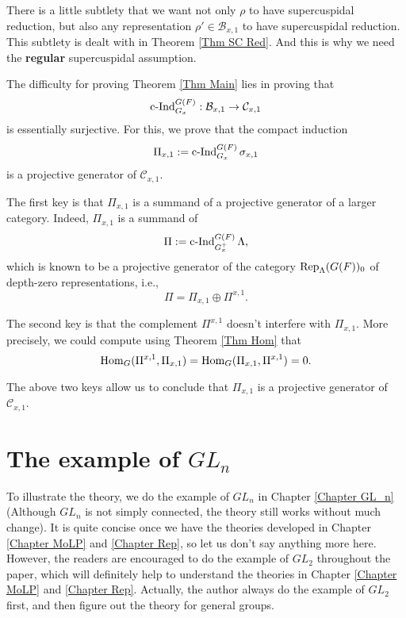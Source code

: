 There is a little subtlety that we want not only $\rho$ to have supercuspidal reduction, but also any representation $\rho' \in \mathcal{B}_{x,1}$ to have supercuspidal reduction. This subtlety is dealt with in Theorem \ref{Thm SC Red}. And this is why we need the \textbf{regular} supercuspidal assumption. 


The difficulty for proving Theorem \ref{Thm Main} lies in proving that
$$\operatorname{\operatorname{c-Ind}}_{G_x}^{G(F)}: \mathcal{B}_{x,1} \to \mathcal{C}_{x,1}$$
is essentially surjective. For this, we prove that the compact induction $$\Pi_{x,1}:=\operatorname{\operatorname{c-Ind}}_{G_x}^{G(F)}\sigma_{x,1}$$ 
is a projective generator of $\mathcal{C}_{x,1}$. 

The first key is that $\Pi_{x,1}$ is a summand of a projective generator of a larger category. Indeed, $\Pi_{x,1}$ is a summand of
$$\Pi:=\operatorname{\operatorname{c-Ind}}_{G_x^+}^{G(F)}\Lambda,$$
which is known to be a projective generator of the category $\operatorname{\operatorname{Rep}}_{\Lambda}(G(F))_0$ of depth-zero representations, i.e., 
$$\Pi=\Pi_{x,1} \oplus \Pi^{x,1}.$$

The second key is that the complement $\Pi^{x,1}$ doesn't interfere with $\Pi_{x,1}$. More precisely, we could compute using Theorem \ref{Thm Hom} that 
$$\operatorname{\operatorname{Hom}}_{G}(\Pi^{x,1}, \Pi_{x,1})=\operatorname{\operatorname{Hom}}_{G}(\Pi_{x,1}, \Pi^{x,1})=0.$$

The above two keys allow us to conclude that $\Pi_{x,1}$ is a projective generator of $\mathcal{C}_{x,1}$. 




\section{The example of $GL_n$}

To illustrate the theory, we do the example of $GL_n$ in Chapter \ref{Chapter GL_n} (Although $GL_n$ is not simply connected, the theory still works without much change). It is quite concise once we have the theories developed in Chapter \ref{Chapter MoLP} and \ref{Chapter Rep}, so let us don't say anything more here. However, the readers are encouraged to do the example of $GL_2$ throughout the paper, which will definitely help to understand the theories in Chapter \ref{Chapter MoLP} and \ref{Chapter Rep}. Actually, the author always do the example of $GL_2$ first, and then figure out the theory for general groups.

